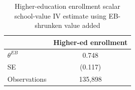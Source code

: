 \begin{table}[!htbp]
\centering
\caption{Higher-education enrollment scalar school-value IV estimate using EB-shrunken value added}
\label{tab:scalar_school_value_iv_higher_ed_enrollment_expected_va_eb}
\begin{tabular}{lc}
\toprule
 & Higher-ed enrollment \\
\midrule
$\theta^{EB}$ & 0.748 \\
SE & (0.117) \\
Observations & 135,898 \\
\bottomrule
\end{tabular}
\end{table}
